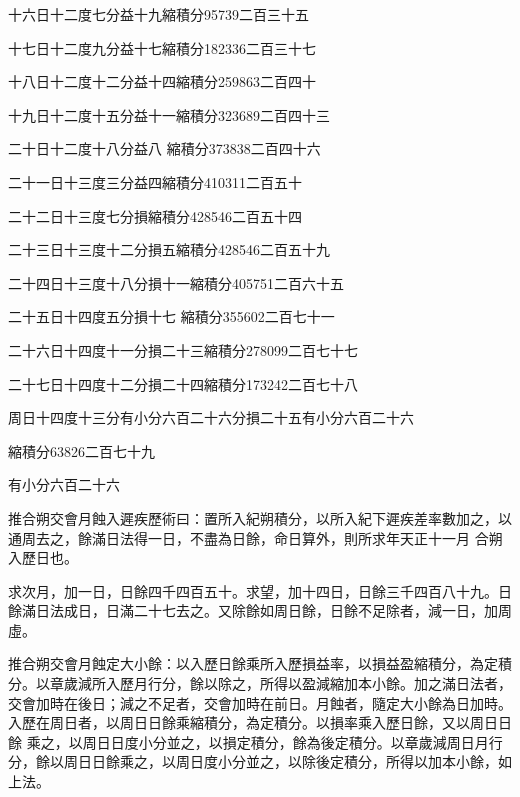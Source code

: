 \begin{pinyinscope}
 十六日十二度七分益十九縮積分95739二百三十五



 十七日十二度九分益十七縮積分182336二百三十七



 十八日十二度十二分益十四縮積分259863二百四十



 十九日十二度十五分益十一縮積分323689二百四十三



 二十日十二度十八分益八
 縮積分373838二百四十六



 二十一日十三度三分益四縮積分410311二百五十



 二十二日十三度七分損縮積分428546二百五十四



 二十三日十三度十二分損五縮積分428546二百五十九



 二十四日十三度十八分損十一縮積分405751二百六十五



 二十五日十四度五分損十七
 縮積分355602二百七十一



 二十六日十四度十一分損二十三縮積分278099二百七十七



 二十七日十四度十二分損二十四縮積分173242二百七十八



 周日十四度十三分有小分六百二十六分損二十五有小分六百二十六



 縮積分63826二百七十九



 有小分六百二十六



 推合朔交會月蝕入遲疾歷術曰：置所入紀朔積分，以所入紀下遲疾差率數加之，以通周去之，餘滿日法得一日，不盡為日餘，命日算外，則所求年天正十一月
 合朔入歷日也。



 求次月，加一日，日餘四千四百五十。求望，加十四日，日餘三千四百八十九。日餘滿日法成日，日滿二十七去之。又除餘如周日餘，日餘不足除者，減一日，加周虛。



 推合朔交會月蝕定大小餘：以入歷日餘乘所入歷損益率，以損益盈縮積分，為定積分。以章歲減所入歷月行分，餘以除之，所得以盈減縮加本小餘。加之滿日法者，交會加時在後日；減之不足者，交會加時在前日。月蝕者，隨定大小餘為日加時。入歷在周日者，以周日日餘乘縮積分，為定積分。以損率乘入歷日餘，又以周日日餘
 乘之，以周日日度小分並之，以損定積分，餘為後定積分。以章歲減周日月行分，餘以周日日餘乘之，以周日度小分並之，以除後定積分，所得以加本小餘，如上法。




\end{pinyinscope}
